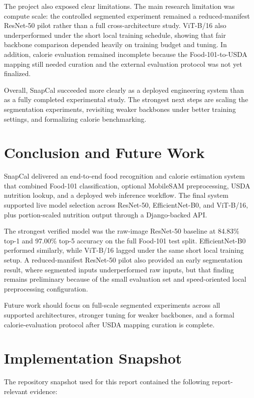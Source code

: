 \documentclass[sigconf,nonacm,11pt]{acmart}
\begin{document}
The project also exposed clear limitations. The main research limitation was compute scale: the controlled segmented experiment remained a reduced-manifest ResNet-50 pilot rather than a full cross-architecture study. ViT-B/16 also underperformed under the short local training schedule, showing that fair backbone comparison depended heavily on training budget and tuning. In addition, calorie evaluation remained incomplete because the Food-101-to-USDA mapping still needed curation and the external evaluation protocol was not yet finalized.

Overall, SnapCal succeeded more clearly as a deployed engineering system than as a fully completed experimental study. The strongest next steps are scaling the segmentation experiments, revisiting weaker backbones under better training settings, and formalizing calorie benchmarking.

\section{Conclusion and Future Work}
SnapCal delivered an end-to-end food recognition and calorie estimation system that combined Food-101 classification, optional MobileSAM preprocessing, USDA nutrition lookup, and a deployed web inference workflow. The final system supported live model selection across ResNet-50, EfficientNet-B0, and ViT-B/16, plus portion-scaled nutrition output through a Django-backed API.

The strongest verified model was the raw-image ResNet-50 baseline at 84.83\% top-1 and 97.00\% top-5 accuracy on the full Food-101 test split. EfficientNet-B0 performed similarly, while ViT-B/16 lagged under the same short local training setup. A reduced-manifest ResNet-50 pilot also provided an early segmentation result, where segmented inputs underperformed raw inputs, but that finding remains preliminary because of the small evaluation set and speed-oriented local preprocessing configuration.

Future work should focus on full-scale segmented experiments across all supported architectures, stronger tuning for weaker backbones, and a formal calorie-evaluation protocol after USDA mapping curation is complete.




\appendix

\section{Implementation Snapshot}
The repository snapshot used for this report contained the following report-relevant evidence:
\end{document}
